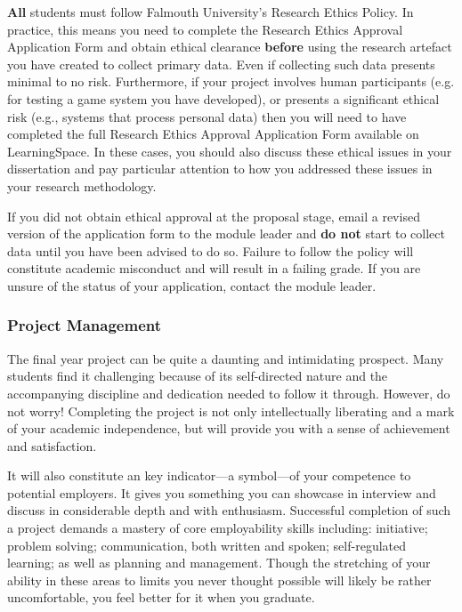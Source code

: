 \documentclass{../fal_assignment}
\begin{document}
\textbf{All} students must follow Falmouth University's Research Ethics Policy. In practice, this means you need to complete the Research Ethics Approval Application Form and obtain ethical clearance \textbf{before} using the research artefact you have created to collect primary data. Even if collecting such data presents minimal to no risk. Furthermore, if your project involves human participants (e.g. for testing a game system you have developed), or presents a significant ethical risk (e.g., systems that process personal data) then you will need to have completed the full Research Ethics Approval Application Form available on LearningSpace. In these cases, you should also discuss these ethical issues in your dissertation and pay particular attention to how you addressed these issues in your research methodology.

If you did not obtain ethical approval at the proposal stage, email a revised version of the application form to the module leader and \textbf{do not} start to collect data until you have been advised to do so. Failure to follow the policy will constitute academic misconduct and will result in a failing grade. If you are unsure of the status of your application, contact the module leader.

\subsubsection*{Project Management}

The final year project can be quite a daunting and intimidating prospect. Many students find it challenging because of its self-directed nature and the accompanying discipline and dedication needed to follow it through. However, do not worry! Completing the project is not only intellectually liberating and a mark of your academic independence, but will provide you with a sense of achievement and satisfaction.

It will also constitute an key indicator---a symbol---of your competence to potential employers. It gives you something you can showcase in interview and discuss in considerable depth and with enthusiasm. Successful completion of such a project demands a mastery of core employability skills including: initiative; problem solving; communication, both written and spoken; self-regulated learning; as well as planning and management. Though the stretching of your ability in these areas to limits you never thought possible will likely be rather uncomfortable, you feel better for it when you graduate.
\end{document}

